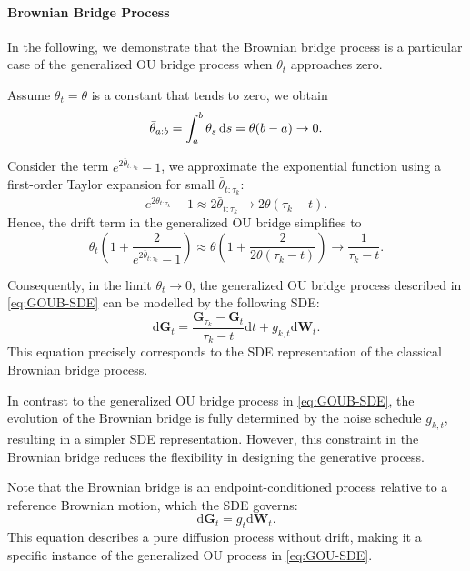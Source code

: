 \paragraph{Brownian Bridge Process}  
In the following, we demonstrate that the Brownian bridge process is a particular case of the generalized OU bridge process when $\theta_t$ approaches zero.

Assume $\theta_t = \theta$ is a constant that tends to zero, we obtain 
\begin{equation}
    \bar{\theta}_{a:b}=\int_a^b \theta_s \mathop{}\!\mathrm{d}{s} = \theta (b-a)\rightarrow 0.
\end{equation}

Consider the term $ e^{2\bar{\theta}_{t:\tau_k}}-1$, we approximate the exponential function using a first-order Taylor expansion for small $\bar{\theta}_{t:\tau_k}$:
\begin{equation}
    e^{2\bar{\theta}_{t:\tau_k}}-1 
    \approx
    2\bar{\theta}_{t:\tau_k}
        \rightarrow
        2\theta(\tau_k - t).
\end{equation}
Hence, the drift term in the generalized OU bridge simplifies to
\begin{equation}
    \theta_t \left( 1 + \frac{2}{e^{2\bar{\theta}_{t:\tau_k}}-1}\right)
     \approx
     \theta\left(1+\frac{2}{2\theta(\tau_k-t)}\right)
     \rightarrow
     \frac{1}{\tau_k-t}.
\end{equation}

Consequently, in the limit $\theta_t \rightarrow 0$, the generalized OU bridge process described in \cref{eq:GOUB-SDE} can be modelled by the following SDE:
\begin{equation}
    \mathrm{d}\bm{G}_t=  \frac{\bm{G}_{\tau_k}-\bm{G}_t}{\tau_k-t}\mathrm{d}t+
    g_{k,t}\mathrm{d}\bm{W}_t.
\end{equation}
This equation precisely corresponds to the SDE representation of the classical Brownian bridge process.


In contrast to the generalized OU bridge process in \cref{eq:GOUB-SDE}, the evolution of the Brownian bridge is fully determined by the noise schedule $g_{k,t}$, resulting in a simpler SDE representation. 
However, this constraint in the Brownian bridge reduces the flexibility in designing the generative process.


Note that the Brownian bridge is an endpoint-conditioned process relative to a reference Brownian motion, which the SDE governs:
\begin{equation}
    \mathrm{d}\bm{G}_t=  
    g_{t}\mathrm{d}\bm{W}_t.
\end{equation}
This equation describes a pure diffusion process without drift, making it a specific instance of the generalized OU process in \cref{eq:GOU-SDE}.

